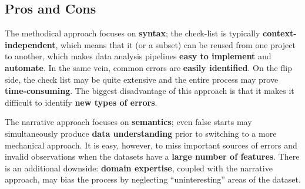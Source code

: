 \subsection{Pros and Cons}
The methodical approach focuses on  \textbf{syntax}; the check-list is typically \textbf{context-independent}, which means that it (or a subset) can be reused from one project to another, which makes data analysis pipelines \textbf{easy to implement} and \textbf{automate}. In the same vein, common errors are \textbf{easily identified}. On the flip side, the check list may be quite extensive and the entire process may prove \textbf{time-consuming}. The biggest disadvantage of this approach is that it makes it difficult to identify \textbf{new types of errors}.\par
The narrative approach focuses on \textbf{semantics}; even false starts may simultaneously produce \textbf{data understanding} prior to switching to a more mechanical approach. It is easy, however, to miss important sources of errors and invalid observations when the datasets have a \textbf{large number of features}. There is an additional downside: \textbf{domain expertise}, coupled with the narrative approach,  may bias the process by neglecting ``uninteresting'' areas of the dataset.
